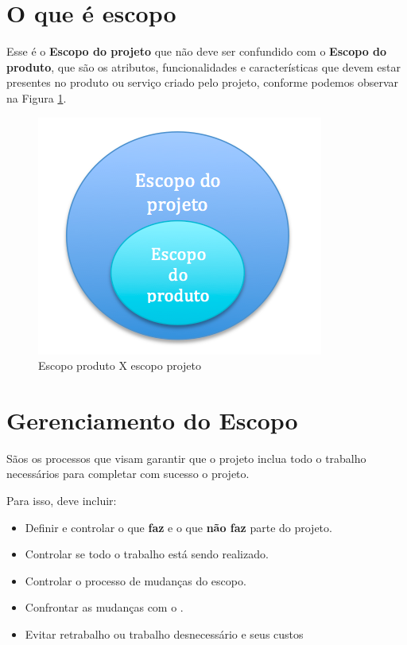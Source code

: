 \section{O que é escopo}


Esse é o \textbf{Escopo do projeto} que não deve ser confundido com o \textbf{Escopo do produto}, que são os atributos, funcionalidades e características que devem estar presentes no produto ou serviço criado pelo projeto, conforme podemos observar na Figura \ref{fig:escopo:proj:prod}.

\begin{figure}[!h]
\centering
\includegraphics[scale=0.5]{Figuras/escopo_proj_prod.png}
\caption{Escopo produto X escopo projeto}
\label{fig:escopo:proj:prod}
\end{figure}

\section{Gerenciamento do Escopo}

Sãos os processos que visam garantir que o projeto inclua todo o trabalho necessários para completar com sucesso o projeto.

Para isso, deve incluir:

\begin{itemize}

\item Definir e controlar o que \textbf{faz} e o que \textbf{não faz} parte do projeto.

\item Controlar se todo o trabalho está sendo realizado.

\item Controlar o processo de mudanças do escopo.

\item Confrontar as mudanças com o \termo.

\item Evitar retrabalho ou trabalho desnecessário e seus custos

\end{itemize}

